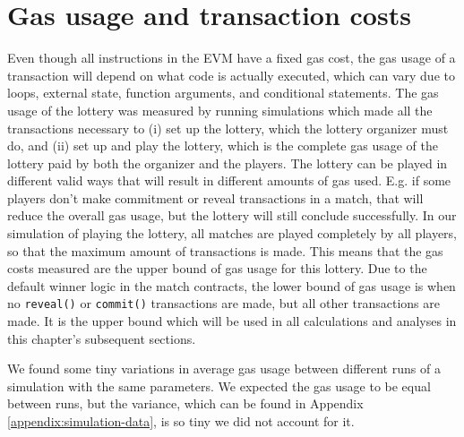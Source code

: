 \section{Gas usage and transaction costs}
\label{sec:gas}

Even though all instructions in the EVM have a fixed gas cost, the gas usage of a transaction will depend on what code is actually executed, which can vary due to loops, external state, function arguments, and conditional statements. The gas usage of the lottery was measured by running simulations which made all the transactions necessary to (i) set up the lottery, which the lottery organizer must do, and (ii) set up and play the lottery, which is the complete gas usage of the lottery paid by both the organizer and the players. The lottery can be played in different valid ways that will result in different amounts of gas used. E.g. if some players don't make commitment or reveal transactions in a match, that will reduce the overall gas usage, but the lottery will still conclude successfully. In our simulation of playing the lottery, all matches are played completely by all players, so that the maximum amount of transactions is made. This means that the gas costs measured are the upper bound of gas usage for this lottery. Due to the default winner logic in the match contracts, the lower bound of gas usage is when no \texttt{reveal()} or \texttt{commit()} transactions are made, but all other transactions are made. It is the upper bound which will be used in all calculations and analyses in this chapter's subsequent sections.

We found some tiny variations in average gas usage between different runs of a simulation with the same parameters. We expected the gas usage to be equal between runs, but the variance, which can be found in Appendix \ref{appendix:simulation-data}, is so tiny we did not account for it.

